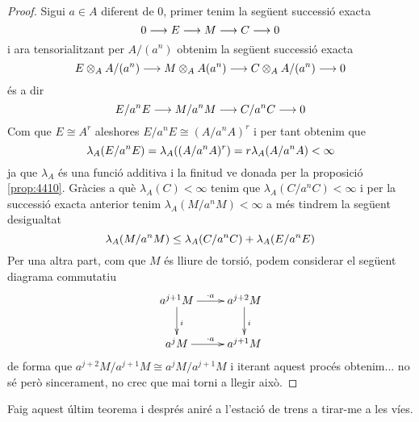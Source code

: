 \documentclass[../../../main.tex]{subfiles}
\begin{document}
\begin{proof}
Sigui $a\in A$ diferent de 0, primer tenim la següent successió exacta
\begin{equation}
    \notag
    0\longrightarrow E\longrightarrow M\longrightarrow C\longrightarrow 0
\end{equation}
i ara tensorialitzant per $A/(a^n)$ obtenim la següent successió exacta
\begin{equation}
    \notag
    E\otimes_AA/(a^n)\longrightarrow M\otimes_AA(a^n)\longrightarrow C\otimes_AA/(a^n)\longrightarrow 0
\end{equation}
és a dir
\begin{equation}
    \notag
    E/a^nE\longrightarrow M/a^nM\longrightarrow C/a^nC\longrightarrow 0
\end{equation}
Com que $E\cong A^r$ aleshores $E/a^nE\cong (A/a^nA)^r$ i per tant obtenim que
\begin{equation}
    \notag
    \lambda_A(E/a^nE) = \lambda_A((A/a^nA)^r) = r\lambda_A(A/a^nA)<\infty
\end{equation}
ja que $\lambda_A$ és una funció additiva i la finitud ve donada per la proposició \ref{prop:4410}. Gràcies a què $\lambda_A(C)<\infty$ tenim que $\lambda_A(C/a^nC)<\infty$ i per la successió exacta anterior tenim $\lambda_A(M/a^nM)<\infty$ a més tindrem la següent desigualtat
\begin{equation}
    \notag
    \lambda_A(M/a^nM)\leq \lambda_A(C/a^nC)+\lambda_A(E/a^nE)
\end{equation}
Per una altra part, com que $M$ és lliure de torsió, podem considerar el següent diagrama commutatiu
\begin{equation}
    \notag
    \xymatrix{
    a^{j+1}M\ar[r]^{\cdotp a} \ar[d]^{i} & a^{j+2}M\ar[d]^{i} \\
    a^jM\ar[r]^{\cdotp a} & a^{j+1}M
    }
\end{equation}
de forma que $a^{j+2}M/a^{j+1}M\cong a^jM/a^{j+1}M$ i iterant aquest procés obtenim... no sé però sincerament, no crec que mai torni a llegir això.
\end{proof}


Faig aquest últim teorema i després aniré a l'estació de trens a tirar-me a les víes.
\end{document}
